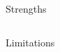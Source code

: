 \documentclass[final]{beamer}
\newcounter{acolumn}%
\def\autoheight{\vspace*{0pt}}%
\begin{document}
\begin{frame}
\begin{acolumns}[t]
\begin{column}{.48\linewidth}
\begin{block}{Strengths}
          \autoheight   
         \end{block}
                      
        \end{column}
                  
        
        \begin{column}{.48\linewidth}
         
         \begin{block}{Limitations}
         
          \autoheight   
         \end{block}
                      
        \end{column}
        
        
        \end{acolumns}
    
    \vfill 
  \end{frame}
\end{document}
